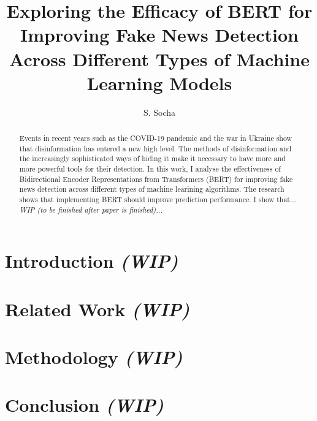 \documentclass[
  journal=largetwo,
  manuscript=article-type,
  year=2023,
  volume=1,
]{cup-journal}
\title{Exploring the Efficacy of BERT for Improving Fake News Detection Across Different Types of Machine Learning Models}
\author{S. Socha}
\affiliation{Faculty of Economic Sciences, University of Warsaw, Warsaw, Poland}
\begin{document}
\begin{abstract}
Events in recent years such as the COVID-19 pandemic and the war in Ukraine show that disinformation has entered a new high level. The methods of disinformation and the increasingly sophisticated ways of hiding it make it necessary to have more and more powerful tools for their detection. In this work, I analyse the effectiveness of Bidirectional Encoder Representations from Transformers (BERT) for improving fake news detection across different types of machine learining algorithms. The research shows that implementing BERT should improve prediction performance. I show that... \textit{WIP (to be finished after paper is finished)...}
\end{abstract}


\section{Introduction \textit{(WIP)}}


\section{Related Work \textit{(WIP)}}


\section{Methodology \textit{(WIP)}}


\section{Conclusion \textit{(WIP)}}




\printendnotes

\printbibliography
\end{document}
